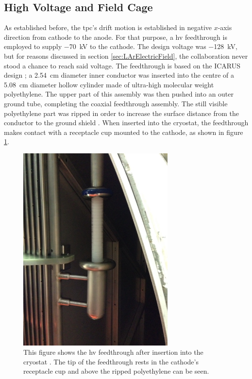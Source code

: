 \subsection{High Voltage and Field Cage}
As established before, the \gls{tpc}'s drift motion is established in negative $x$-axis direction from cathode to the anode. For that purpose, a \gls{hv} feedthrough is employed to supply \SI{-70}{\kilo\volt} to the cathode. The design voltage was \SI{-128}{\kilo\volt}, but for reasons discussed in section \ref{sec:LArElectricField}, the collaboration never stood a chance to reach said voltage. The feedthrough is based on the ICARUS design \cite{ICARUST600}; a \SI{2.54}{\centi\metre} diameter inner conductor was inserted into the centre of a \SI{5.08}{\centi\metre} diameter hollow cylinder made of ultra-high molecular weight polyethylene. The upper part of this assembly was then pushed into an outer ground tube, completing the coaxial feedthrough assembly. The still visible polyethylene part was ripped in order to increase the surface distance from the conductor to the ground shield \cite{MicroBooNEDetector}. When inserted into the cryostat, the feedthrough makes contact with a receptacle cup mounted to the cathode, as shown in figure \ref{fig:HVFeedthrough}.
\begin{figure}[htbp]
    \centering
    \includegraphics[width=0.7\textwidth]{images/MicroBooNE/HVFeedthroughCryostat.jpg}
    \caption[HV Feedthrough of MicroBooNE]{This figure shows the \gls{hv} feedthrough after insertion into the cryostat \cite{MicroBooNEDetector}. The tip of the feedthrough rests in the cathode's receptacle cup and above the ripped polyethylene can be seen.}
    \label{fig:HVFeedthrough}
\end{figure}

